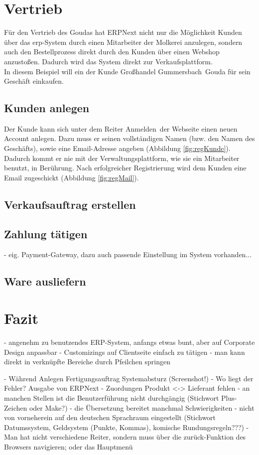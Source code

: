\section{Vertrieb}
Für den Vertrieb des Goudas  hat ERPNext nicht nur die Möglichkeit Kunden über das \gls{erp}-System durch einen Mitarbeiter der Molkerei anzulegen, sondern auch den Bestellprozess direkt durch den Kunden über einen Webshop anzustoßen. Dadurch wird das System direkt zur Verkaufsplattform.\\
In diesem Beispiel will ein der Kunde \glqq Großhandel Gummersbach\grqq\ Gouda für sein Geschäft einkaufen.

\subsection{Kunden anlegen}
Der Kunde kann sich unter dem Reiter \glqq Anmelden\grqq\ der Webseite einen neuen Account anlegen. Dazu muss er seinen vollständigen Namen (bzw. den Namen des Geschäfts), sowie eine Email-Adresse angeben (\vgl Abbildung \ref{fig:regKunde}). Dadurch kommt er nie mit der Verwaltungsplattform, wie sie ein Mitarbeiter benutzt, in Berührung. Nach erfolgreicher Registrierung wird dem Kunden eine Email zugeschickt (\vgl Abbildung \ref{fig:regMail}).

\subsection{Verkaufsauftrag erstellen}

\subsection{Zahlung tätigen}
- eig. Payment-Gateway, dazu auch passende Einstellung im System vorhanden...

\subsection{Ware ausliefern}

\section{Fazit}
- angenehm zu benutzendes ERP-System, anfangs etwas bunt, aber auf Corporate Design anpassbar
- Customizings auf Clientseite einfach zu tätigen
- man kann direkt in verknüpfte Bereiche durch Pfeilchen springen

- Während Anlegen Fertigungsauftrag Systemabsturz (Screenshot!) - Wo liegt der Fehler? Ausgabe von ERPNext
- Zuordungen Produkt <-> Lieferant fehlen
- an manchen Stellen ist die Benutzerführung nicht durchgängig (Stichwort Plus-Zeichen oder Make?)
- die Übersetzung bereitet manchmal Schwierigkeiten
- nicht von vorneherein auf den deutschen Sprachraum eingestellt (Stichwort Datumssystem, Geldsystem (Punkte, Kommas), komische Rundungsregeln???)
- Man hat nicht verschiedene Reiter, sondern muss über die zurück-Funktion des Browsers navigieren; oder das Hauptmenü
